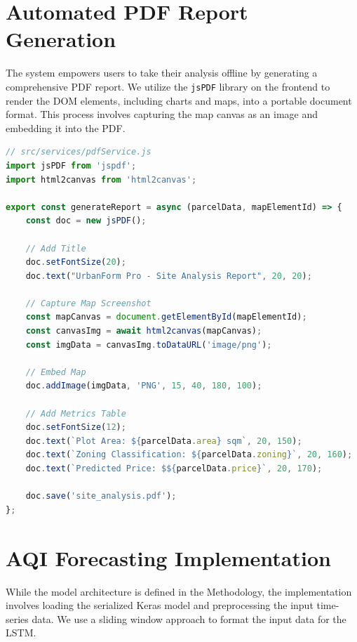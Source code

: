 \documentclass[12pt,a4paper]{report}
\begin{document}
\section{Automated PDF Report Generation}
The system empowers users to take their analysis offline by generating a comprehensive PDF report. We utilize the \texttt{jsPDF} library on the frontend to render the DOM elements, including charts and maps, into a portable document format. This process involves capturing the map canvas as an image and embedding it into the PDF.

\begin{lstlisting}[language=JavaScript, caption=PDF Generation Service]
// src/services/pdfService.js
import jsPDF from 'jspdf';
import html2canvas from 'html2canvas';

export const generateReport = async (parcelData, mapElementId) => {
    const doc = new jsPDF();
    
    // Add Title
    doc.setFontSize(20);
    doc.text("UrbanForm Pro - Site Analysis Report", 20, 20);
    
    // Capture Map Screenshot
    const mapCanvas = document.getElementById(mapElementId);
    const canvasImg = await html2canvas(mapCanvas);
    const imgData = canvasImg.toDataURL('image/png');
    
    // Embed Map
    doc.addImage(imgData, 'PNG', 15, 40, 180, 100);
    
    // Add Metrics Table
    doc.setFontSize(12);
    doc.text(`Plot Area: ${parcelData.area} sqm`, 20, 150);
    doc.text(`Zoning Classification: ${parcelData.zoning}`, 20, 160);
    doc.text(`Predicted Price: $${parcelData.price}`, 20, 170);
    
    doc.save('site_analysis.pdf');
};
\end{lstlisting}

\section{AQI Forecasting Implementation}
While the model architecture is defined in the Methodology, the implementation involves loading the serialized Keras model and preprocessing the input time-series data. We use a sliding window approach to format the input data for the LSTM.
\end{document}
